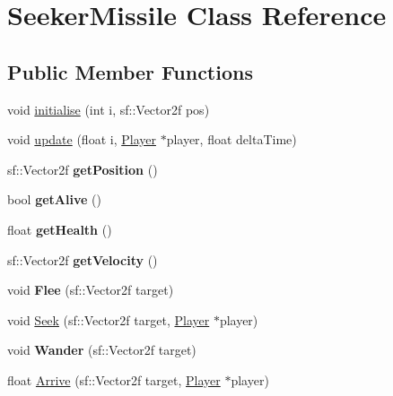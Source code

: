 \hypertarget{class_seeker_missile}{}\section{Seeker\+Missile Class Reference}
\label{class_seeker_missile}
\subsection*{Public Member Functions}
\begin{DoxyCompactItemize}
\item 
void \mbox{\hyperlink{class_seeker_missile_a09c20c51520a2ee6c3282d7284ec1528}{initialise}} (int i, sf\+::\+Vector2f pos)
\item 
void \mbox{\hyperlink{class_seeker_missile_af3baaea8b9680a9acb037a1596d9403b}{update}} (float i, \mbox{\hyperlink{class_player}{Player}} $\ast$player, float delta\+Time)
\item 
\mbox{\label{class_seeker_missile_aec565a6d030044f0b96b6b9e599aff80}} 
sf\+::\+Vector2f {\bfseries get\+Position} ()
\item 
\mbox{\label{class_seeker_missile_ae60ac129a3cc0810b98e8284b3d622af}} 
bool {\bfseries get\+Alive} ()
\item 
\mbox{\label{class_seeker_missile_a34ee6daa06745c921bc27e13e0ac8150}} 
float {\bfseries get\+Health} ()
\item 
\mbox{\label{class_seeker_missile_a21ff15f78ec3ceb191735b13b2f86aeb}} 
sf\+::\+Vector2f {\bfseries get\+Velocity} ()
\item 
\mbox{\label{class_seeker_missile_aaead4b6d7f967a6a7de3b53a4b5b425a}} 
void {\bfseries Flee} (sf\+::\+Vector2f target)
\item 
void \mbox{\hyperlink{class_seeker_missile_a1fe0f447573c340c2a11c0313ebf9ea2}{Seek}} (sf\+::\+Vector2f target, \mbox{\hyperlink{class_player}{Player}} $\ast$player)
\item 
\mbox{\label{class_seeker_missile_a0cf52290284abf389c795efc9a1db3d1}} 
void {\bfseries Wander} (sf\+::\+Vector2f target)
\item 
float \mbox{\hyperlink{class_seeker_missile_afd7d8339af95452635f7ed84373c66b0}{Arrive}} (sf\+::\+Vector2f target, \mbox{\hyperlink{class_player}{Player}} $\ast$player)

\end{DoxyCompactItemize}
